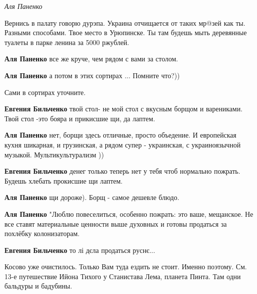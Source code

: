  
 
 
 
 
\zzSecCmt

\begin{itemize} %
\emph{Аля Паненко}

Вернись в палату говорю дурэпа. Украина отчищается от таких мр@зей как ты.
Разными способами. Твое место в Урюпинске. Ты там будешь мыть деревянные
туалеты в парке ленина за 5000 ржублей.

\begin{itemize} %
\textbf{Аля Паненко} все же круче, чем рядом с вами за столом.


\textbf{Аля Паненко} а потом в этих сортирах ... Помните что?))

Сами в сортирах уточните.

\textbf{Евгения Бильченко} твой стол- не мой стол с вкусным борщом и варениками. Твой стол -это бояра и прикисшие щи, да лаптем.

\textbf{Аля Паненко} нет, борщи здесь отличные, просто объедение. И европейская кухня шикарная, и грузинская, а рядом супер - украинская, с украиноязычной музыкой. Мультикультурализм ))

\textbf{Евгения Бильченко} денег только теперь нет у тебя чтоб нормально пожрать. Будешь хлебать прокисшие щи лаптем.


\textbf{Аля Паненко} щи дороже). Борщ - самое дешевле блюдо.

\textbf{Аля Паненко} "Люблю повеселиться, особенно пожрать: это ваше, мещанское. Не все ставят материальные ценности выше духовных и готовы продаться за похлёбку колонизаторам.

\textbf{Евгения Бильченко} то лі дєла продаться руснє...


Косово уже очистилось. Только Вам туда ездить не стоит. Именно поэтому. См.
13-е путешествие Ийона Тихого у Станистава Лема, планета Пинта. Там одни
бальдуры и бадубины.


\end{itemize}
\end{itemize}
